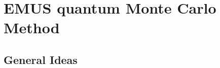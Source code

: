 \documentclass[aps,prx,twocolumn,superscriptaddress,showpacs,floatfix]{revtex4-1}
\begin{document}


\section{EMUS quantum Monte Carlo Method}
\label{sec:method}

\subsection{General Ideas}
\label{sec:ideas}
\end{document}
